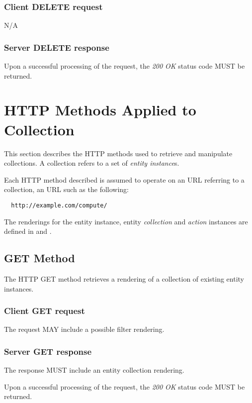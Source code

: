 \documentclass[10pt,a4paper]{article}
\begin{document}
\subsubsection*{Client DELETE request}
N/A

\subsubsection*{Server DELETE response}
Upon a successful processing of the request, the \emph{200 OK} status code MUST be returned.

\section{HTTP Methods Applied to Collection}



This section describes the HTTP methods used to retrieve and manipulate
collections. A collection refers to a set of {\em entity instance}s.

Each HTTP method described is assumed to operate
on an URL referring to a collection, an URL such as the following:
\begin{verbatim}
  http://example.com/compute/
\end{verbatim}

The renderings for the entity instance, entity {\em collection} and {\em action}
instances are defined in \cite{occi:text} and \cite{occi:json}.

\subsection{GET Method}
The HTTP GET method retrieves a rendering of a collection of existing entity instances.

\subsubsection*{Client GET request}
The request MAY include a possible filter rendering.

\subsubsection*{Server GET response}
The response MUST include an entity collection rendering.

Upon a successful processing of the request, the \emph{200 OK} status code MUST be returned.
\end{document}
